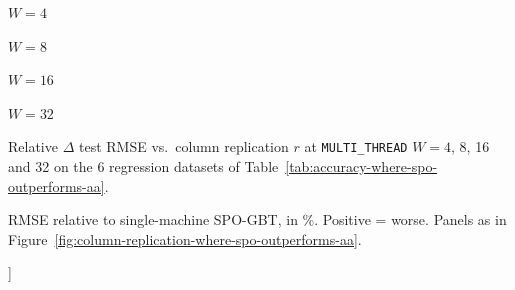 \documentclass[sigconf,screen]{acmart}
\begin{document}
{\begin{minipage}{\textwidth}
\par\bigskip\centering\captionsetup{type=figure}
\begin{minipage}[t]{0.245\textwidth}\centering\footnotesize $W=4$\\\resizebox{\linewidth}{!}{\begin{minipage}{\colrepw}\end{minipage}}\end{minipage}\hfill
\begin{minipage}[t]{0.245\textwidth}\centering\footnotesize $W=8$\\\resizebox{\linewidth}{!}{\begin{minipage}{\colrepw}\end{minipage}}\end{minipage}\hfill
\begin{minipage}[t]{0.245\textwidth}\centering\footnotesize $W=16$\\\resizebox{\linewidth}{!}{\begin{minipage}{\colrepw}\end{minipage}}\end{minipage}\hfill
\begin{minipage}[t]{0.245\textwidth}\centering\footnotesize $W=32$\\\resizebox{\linewidth}{!}{\begin{minipage}{\colrepw}\end{minipage}}\end{minipage}
\caption{Relative $\Delta$ test RMSE vs.\ column replication $r$ at \texttt{MULTI\_THREAD} $W=4$, 8, 16 and 32 on the 6 regression datasets of Table~\ref{tab:accuracy-where-spo-outperforms-aa}.}
\label{fig:column-replication-where-spo-outperforms-aa-regression}
\par\smallskip\raggedright\footnotesize RMSE relative to single-machine SPO-GBT, in \%. Positive = worse. Panels as in Figure~\ref{fig:column-replication-where-spo-outperforms-aa}.
\end{minipage}
}]
\end{document}
